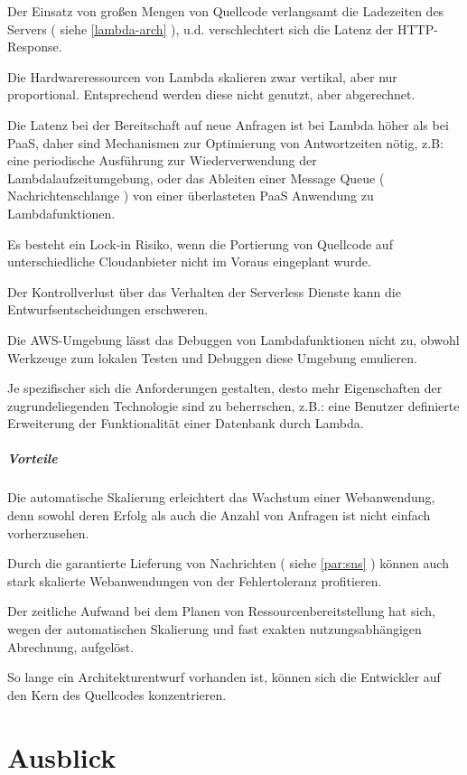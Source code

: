 \documentclass[
12pt,
english,
ngerman,
headsepline,
twoside,
openright,
numbers=noenddot,version=first
]{scrreprt}
\begin{document}
Der Einsatz von großen Mengen von Quellcode verlangsamt die Ladezeiten des Servers ( siehe \autoref{lambda-arch} ), u.d. verschlechtert sich die Latenz der HTTP-Response.

Die Hardwareressourcen von Lambda skalieren zwar vertikal, aber nur proportional. Entsprechend werden diese nicht genutzt, aber abgerechnet. 

Die Latenz bei der Bereitschaft auf neue Anfragen ist bei Lambda höher als bei \acrshort{PaaS}, daher sind Mechanismen zur Optimierung von Antwortzeiten nötig, z.B: eine periodische Ausführung zur Wiederverwendung der Lambdalaufzeitumgebung, oder das Ableiten einer Message Queue ( Nachrichtenschlange ) von einer überlasteten \acrshort{PaaS} Anwendung zu Lambdafunktionen.

Es besteht ein Lock-in Risiko, wenn die Portierung von Quellcode auf unterschiedliche Cloudanbieter nicht im Voraus eingeplant wurde.

Der Kontrollverlust über das Verhalten der Serverless Dienste kann die Entwurfsentscheidungen erschweren.


Die AWS-Umgebung lässt das Debuggen von Lambdafunktionen nicht zu, obwohl Werkzeuge zum lokalen Testen und Debuggen diese Umgebung emulieren.

Je spezifischer sich die Anforderungen gestalten, desto mehr Eigenschaften der zugrundeliegenden Technologie sind zu beherrschen, z.B.: eine Benutzer definierte Erweiterung der Funktionalität einer Datenbank durch Lambda.

\paragraph{Vorteile}
Die automatische Skalierung erleichtert das Wachstum einer Webanwendung, denn sowohl deren Erfolg als auch die Anzahl von Anfragen ist nicht einfach vorherzusehen.

Durch die garantierte Lieferung von Nachrichten ( siehe \autoref{par:sns} ) können auch stark skalierte 
Webanwendungen von der Fehlertoleranz profitieren.

Der zeitliche Aufwand bei dem Planen von Ressourcenbereitstellung hat sich, wegen der automatischen Skalierung und fast exakten nutzungsabhängigen Abrechnung, aufgelöst.

So lange ein Architekturentwurf vorhanden ist, können sich die Entwickler auf den Kern des Quellcodes konzentrieren.



\chapter{Ausblick}
\end{document}
